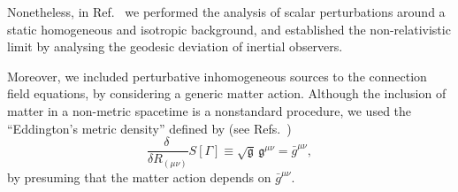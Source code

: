 \documentclass[aps,prl,twocolumn,superscriptaddress,showpacs,showkeys]{revtex4-1}
\begin{document}
Nonetheless, in Ref.~\cite{Skirzewski:2014eta} we performed the analysis of scalar perturbations around a static homogeneous and isotropic background, and established the non-relativistic limit by analysing the geodesic deviation of inertial observers.

Moreover, we included perturbative inhomogeneous sources to the connection field equations, by considering a generic matter action. Although the inclusion of matter in a non-metric spacetime is a nonstandard procedure, we used the ``Eddington's metric density'' defined by (see Refs.~\cite{Eddington1923math,schrodinger1950space,Poplawski:2012bw})
\begin{equation}
  \label{metric}
  \frac{\delta\ }{\delta R_{(\mu\nu)}} S[\Gamma] \equiv \sqrt{\mathfrak{g}} \, \mathfrak{g}^{\mu\nu} = \bar{g}^{\mu\nu} ,
\end{equation}
by presuming that the matter action depends on $\bar{g}^{\mu\nu}$.
\end{document}
